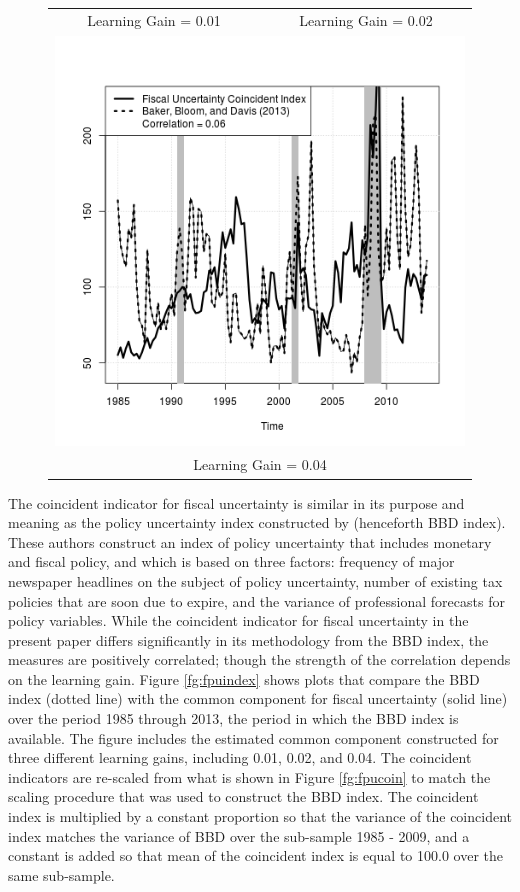 \documentclass[11pt]{article}
\newcommand{\citee}[1]{\citet{#1}}
\begin{document}
\begin{figure}
\begin{tabular}{cc}
Learning Gain = 0.01 & Learning Gain = 0.02 \\ 
\multicolumn{2}{c}{\includegraphics[scale=0.5]{./results/pics0.04/fpuindex.png}} \\
\multicolumn{2}{c}{Learning Gain = 0.04} 
\end{tabular}
\end{figure} 

The coincident indicator for fiscal uncertainty is similar in its purpose and meaning as the policy uncertainty index constructed by \citee{baker2013} (henceforth BBD index).  These authors construct an index of policy uncertainty that includes monetary and fiscal policy, and which is based on three factors: frequency of major newspaper headlines on the subject of policy uncertainty, number of existing tax policies that are soon due to expire, and the variance of professional forecasts for policy variables.  While the coincident indicator for fiscal uncertainty in the present paper differs significantly in its methodology from the BBD index, the measures are positively correlated; though the strength of the correlation depends on the learning gain.  Figure \ref{fg:fpuindex} shows plots that compare the BBD index (dotted line) with the common component for fiscal uncertainty (solid line) over the period 1985 through 2013, the period in which the BBD index is available.  The figure includes the estimated common component constructed for three different learning gains, including 0.01, 0.02, and 0.04.  The coincident indicators are re-scaled from what is shown in Figure \ref{fg:fpucoin} to match the scaling procedure that was used to construct the BBD index.  The coincident index is multiplied by a constant proportion so that the variance of the coincident index matches the variance of BBD over the sub-sample 1985 - 2009, and a constant is added so that mean of the coincident index is equal to 100.0 over the same sub-sample.
\end{document}
